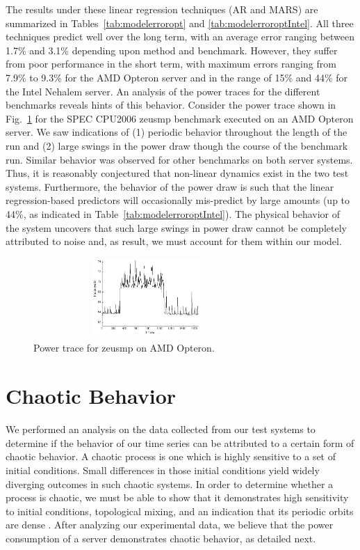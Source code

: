\documentclass[times,10pt,finalversion]{usetex-v1}
\renewcommand{\figurename}{Fig.}
\begin{document}
The results under these linear regression techniques (AR and MARS) are
summarized in Tables~\ref{tab:modelerroropt} and
\ref{tab:modelerroroptIntel}. All three techniques predict well over the
long term, with an average error ranging between 1.7\% and 3.1\%
depending upon method and benchmark.  However, they suffer from poor
performance in the short term, with maximum errors ranging from 7.9\% to
9.3\% for the AMD Opteron server and in the range of 15\% and 44\% for
the Intel Nehalem server. An analysis of the power traces for the
different benchmarks reveals hints of this behavior.  Consider the power
trace shown in \figurename~\ref{fig:amdzeusmppwr} for the SPEC CPU2006
zeusmp benchmark executed on an AMD Opteron server.  We saw indications
of (1) periodic behavior throughout the length of the run and (2) large
swings in the power draw though the course of the benchmark run. Similar
behavior was observed for other benchmarks on both server systems.
Thus, it is reasonably conjectured that non-linear dynamics exist in the
two test systems.  Furthermore, the behavior of the power draw is such
that the linear regression-based predictors will occasionally
mis-predict by large amounts (up to 44\%, as indicated in
Table~\ref{tab:modelerroroptIntel}).  The physical behavior of the
system uncovers that such large swings in power draw cannot be
completely attributed to noise and, as result, we must account for them
within our model.
\begin{figure}[bthp]
      \centering
      \includegraphics[width=3.4in,height=1.2in]{amdzeusmppwr2}
      \caption{Power trace for zeusmp on AMD Opteron.}
      \label{fig:amdzeusmppwr}
\end{figure}
\section{Chaotic Behavior}
\label{sec:chaos}
We performed an analysis on the data collected from our test systems to
determine if the behavior of our time series can be attributed to a certain
form of chaotic behavior.  A chaotic process is one which is highly
sensitive to a set of initial conditions.  Small differences in those
initial conditions yield widely diverging outcomes in such chaotic
systems.  In order to determine whether a process is chaotic, we must be
able to show that it demonstrates high sensitivity to initial
conditions, topological mixing, and an indication that its periodic
orbits are dense \cite{Sprott2003}. After analyzing our experimental
data, we believe that the power consumption of a server demonstrates
chaotic behavior, as detailed next. 
\end{document}
